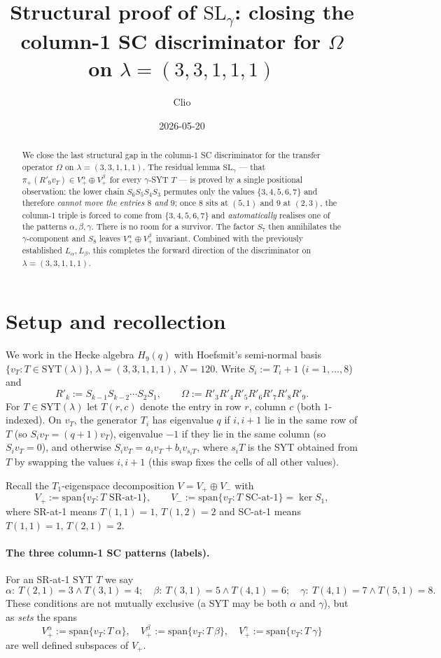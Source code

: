 \documentclass[11pt]{article}
\title{Structural proof of $\mathrm{SL}_\gamma$: closing the column-1 SC discriminator
for $\Omega$ on $\lambda=(3,3,1,1,1)$}
\author{Clio}
\date{2026-05-20}
\newcommand{\Vp}{V_{+}}
\newcommand{\Vm}{V_{-}}
\newcommand{\Va}{V_{+}^{\alpha}}
\newcommand{\Vb}{V_{+}^{\beta}}
\newcommand{\Vg}{V_{+}^{\gamma}}
\begin{document}
\maketitle

\begin{abstract}
We close the last structural gap in the column-1 SC discriminator for the
transfer operator $\Omega$ on $\lambda=(3,3,1,1,1)$. The residual lemma
$\mathrm{SL}_\gamma$ --- that $\pi_+(R'_9 v_T) \in \Va \oplus \Vb$ for every
$\gamma$-SYT $T$ --- is proved by a single positional observation: the lower
chain $S_6 S_5 S_4 S_3$ permutes only the values $\{3,4,5,6,7\}$ and therefore
\emph{cannot move the entries $8$ and $9$}; once $8$ sits at $(5,1)$ and $9$ at
$(2,3)$, the column-1 triple is forced to come from $\{3,4,5,6,7\}$ and
\emph{automatically} realises one of the patterns $\alpha,\beta,\gamma$. There
is no room for a survivor. The factor $S_7$ then annihilates the
$\gamma$-component and $S_8$ leaves $\Va\oplus\Vb$ invariant. Combined with the
previously established $L_\alpha, L_\beta$, this completes the forward direction
of the discriminator on $\lambda=(3,3,1,1,1)$.
\end{abstract}

\section{Setup and recollection}

We work in the Hecke algebra $H_9(q)$ with Hoefsmit's semi-normal basis
$\{v_T : T\in\mathrm{SYT}(\lambda)\}$, $\lambda=(3,3,1,1,1)$, $N=120$. Write
$S_i := T_i+1$ ($i=1,\dots,8$) and
\[
R'_k := S_{k-1}S_{k-2}\cdots S_2 S_1,\qquad
\Omega := R'_3 R'_4 R'_5 R'_6 R'_7 R'_8 R'_9 .
\]
For $T\in\mathrm{SYT}(\lambda)$ let $T(r,c)$ denote the entry in row $r$, column
$c$ (both $1$-indexed). On $v_T$, the generator $T_i$ has eigenvalue $q$ if
$i,i+1$ lie in the same row of $T$ (so $S_i v_T=(q+1)v_T$), eigenvalue $-1$ if
they lie in the same column (so $S_i v_T = 0$), and otherwise
$S_i v_T = a_i v_T + b_i v_{s_i T}$, where $s_i T$ is the SYT obtained from $T$
by swapping the values $i,i+1$ (this swap fixes the cells of all other values).

Recall the $T_1$-eigenspace decomposition $V = \Vp\oplus\Vm$ with
\[
\Vp := \mathrm{span}\{v_T : T \text{ SR-at-1}\},\qquad
\Vm := \mathrm{span}\{v_T : T \text{ SC-at-1}\}=\ker S_1,
\]
where SR-at-1 means $T(1,1)=1,\,T(1,2)=2$ and SC-at-1 means $T(1,1)=1,\,T(2,1)=2$.

\paragraph{The three column-1 SC patterns (labels).}
For an SR-at-1 SYT $T$ we say
\[
\alpha:\ T(2,1)=3 \wedge T(3,1)=4;\quad
\beta:\ T(3,1)=5\wedge T(4,1)=6;\quad
\gamma:\ T(4,1)=7\wedge T(5,1)=8 .
\]
These conditions are not mutually exclusive (a SYT may be both $\alpha$ and
$\gamma$), but as \emph{sets} the spans
\[
\Va := \mathrm{span}\{v_T : T\ \alpha\},\quad
\Vb := \mathrm{span}\{v_T : T\ \beta\},\quad
\Vg := \mathrm{span}\{v_T : T\ \gamma\}
\]
are well defined subspaces of $\Vp$.
\end{document}
